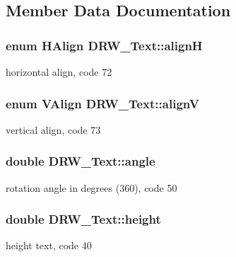 \subsection{Member Data Documentation}
\hypertarget{class_d_r_w___text_ace4ad466c2d13111f69b4413c279987e}{}
\subsubsection[{align\+H}]{\setlength{\rightskip}{0pt plus 5cm}enum {\bf H\+Align} D\+R\+W\+\_\+\+Text\+::align\+H}\label{class_d_r_w___text_ace4ad466c2d13111f69b4413c279987e}
horizontal align, code 72 \hypertarget{class_d_r_w___text_a1b3c6431eb7c016e3521a46dc24bd57e}{}
\subsubsection[{align\+V}]{\setlength{\rightskip}{0pt plus 5cm}enum {\bf V\+Align} D\+R\+W\+\_\+\+Text\+::align\+V}\label{class_d_r_w___text_a1b3c6431eb7c016e3521a46dc24bd57e}
vertical align, code 73 \hypertarget{class_d_r_w___text_aad647ab8b0086a18978dd0b291569e5b}{}
\subsubsection[{angle}]{\setlength{\rightskip}{0pt plus 5cm}double D\+R\+W\+\_\+\+Text\+::angle}\label{class_d_r_w___text_aad647ab8b0086a18978dd0b291569e5b}
rotation angle in degrees (360), code 50 \hypertarget{class_d_r_w___text_ad38ec2dfef3ab3c4367423a0d4e49c05}{}
\subsubsection[{height}]{\setlength{\rightskip}{0pt plus 5cm}double D\+R\+W\+\_\+\+Text\+::height}\label{class_d_r_w___text_ad38ec2dfef3ab3c4367423a0d4e49c05}
height text, code 40 \hypertarget{class_d_r_w___text_ab273757633e67aa82b17b6b1141c8b98}{}
